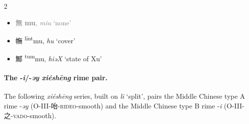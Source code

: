 \begin{multicols}{2}
\medskip

\begin{itemize}
    \item {\textcolor{gray}{{\Large{無}} %
    {\large{\textbf{mu}}},
    \textit{miu} %
    `none'}}

    \item {\Large{幠}} %
    {\large{{\textsuperscript{lint}mu}}},
    \textit{hu} %
    `cover'

    \item {\Large{鄦}} %
    {\large{{\textsuperscript{tum}mu}}},
    \textit{hiəX} %
    `state of Xu'
\end{itemize}

\end{multicols}


\paragraph{The -\textit{i}/-\textit{əy} \textit{xiéshēng} rime pair.}
\label{par:i-əy-XS-pair}
The following \textit{xiéshēng} series, built on {} \textit{li} `split', 
pairs the Middle Chinese type A rime -\textit{əy} (O-III-咍-\textsc{rideo}-smooth) and the Middle Chinese type B rime -\textit{i} (O-III-之-\textsc{vado}-smooth).


